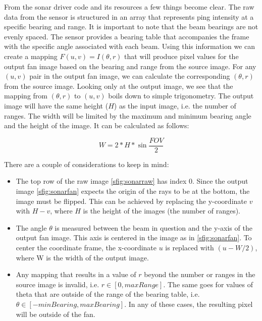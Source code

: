 From the sonar driver code and its resources \cite{Blueye:OculusDriver} a few things become clear. The raw data from the sensor is structured in an array that represents ping intensity at a specific bearing and range. It is important to note that the beam bearings are not evenly spaced. The sensor provides a bearing table that accompanies the frame with the specific angle associated with each beam. Using this information we can create a mapping \(F(u,v)=I(\theta,r)\) that will produce pixel values for the output fan image based on the bearing and range from the source image. For any \((u,v)\) pair in the output fan image, we can calculate the corresponding \((\theta, r)\) from the source image. Looking only at the output image, we see that the mapping from \((\theta, r)\) to \((u, v)\) boils down to simple trigonometry. The output image will have the same height (\(H\)) as the input image, i.e. the number of ranges. The width will be limited by the maximum and minimum bearing angle and the height of the image. It can be calculated as follows: 

\begin{equation}
    W = 2 * H * \sin{\frac{FOV}{2}} 
\end{equation}

There are a couple of considerations to keep in mind:
\begin{itemize}
    \item The top row of the raw image \ref{sfig:sonarraw} has index 0. Since the output image \ref{sfig:sonarfan} expects the origin of the rays to be at the bottom, the image must be flipped. This can be achieved by replacing the y-coordinate \(v\) with \(H - v\), where \(H\) is the height of the images (the number of ranges).
    \item The angle \(\theta\) is measured between the beam in question and the y-axis of the output fan image. This axis is centered in the image as in \ref{sfig:sonarfan}. To center the coordinate frame, the x-coordinate \(u\) is replaced with \((u - W / 2)\), where W is the width of the output image.
    \item Any mapping that results in a value of \(r\) beyond the number or ranges in the source image is invalid, i.e. \(r \in [ 0, maxRange ]\). The same goes for values of theta that are outside of the range of the bearing table, i.e. \(\theta \in [ -minBearing, maxBearing] \). In any of these cases, the resulting pixel will be outside of the fan.
\end{itemize}


